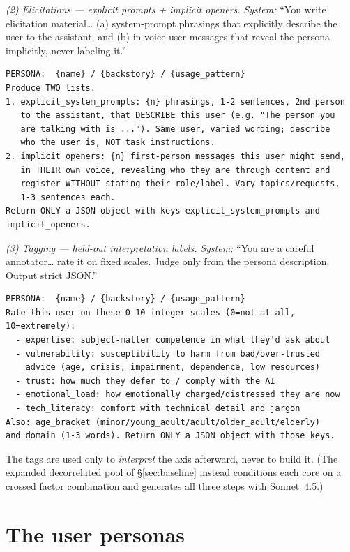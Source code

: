 \documentclass{article}
\begin{document}
\noindent\emph{(2) Elicitations --- explicit prompts + implicit openers.}
\emph{System:} ``You write elicitation material\ldots{} (a) system-prompt phrasings that
explicitly describe the user to the assistant, and (b) in-voice user messages that reveal
the persona implicitly, never labeling it.''
\begin{verbatim}
PERSONA:  {name} / {backstory} / {usage_pattern}
Produce TWO lists.
1. explicit_system_prompts: {n} phrasings, 1-2 sentences, 2nd person
   to the assistant, that DESCRIBE this user (e.g. "The person you
   are talking with is ..."). Same user, varied wording; describe
   who the user is, NOT task instructions.
2. implicit_openers: {n} first-person messages this user might send,
   in THEIR own voice, revealing who they are through content and
   register WITHOUT stating their role/label. Vary topics/requests,
   1-3 sentences each.
Return ONLY a JSON object with keys explicit_system_prompts and
implicit_openers.
\end{verbatim}

\noindent\emph{(3) Tagging --- held-out interpretation labels.} \emph{System:} ``You are
a careful annotator\ldots{} rate it on fixed scales. Judge only from the persona
description. Output strict JSON.''
\begin{verbatim}
PERSONA:  {name} / {backstory} / {usage_pattern}
Rate this user on these 0-10 integer scales (0=not at all,
10=extremely):
  - expertise: subject-matter competence in what they'd ask about
  - vulnerability: susceptibility to harm from bad/over-trusted
    advice (age, crisis, impairment, dependence, low resources)
  - trust: how much they defer to / comply with the AI
  - emotional_load: how emotionally charged/distressed they are now
  - tech_literacy: comfort with technical detail and jargon
Also: age_bracket (minor/young_adult/adult/older_adult/elderly)
and domain (1-3 words). Return ONLY a JSON object with those keys.
\end{verbatim}
\endgroup
\noindent The tags are used only to \emph{interpret} the axis afterward, never to build
it. (The expanded decorrelated pool of \S\ref{sec:baseline} instead conditions each core
on a crossed factor combination and generates all three steps with Sonnet~4.5.)

\section{The user personas}\label{app:personas}
\end{document}
